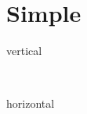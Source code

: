 \documentclass{article}
\begin{document}
\section{Simple}


\begin{stack}{vertical}
\end{stack}\\ \newline

\begin{stack}{horizontal}
\end{stack}
\end{document}
